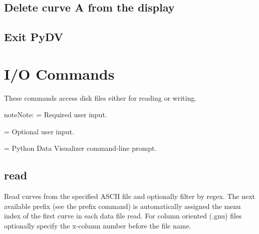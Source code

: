 \documentclass[letterpaper,10pt,english]{sphinxmanual}
\begin{document}
\subsection{Delete curve A from the display}
\label{\detokenize{getting_started:delete-curve-a-from-the-display}}
\begin{sphinxVerbatim}[commandchars=\\\{\}]
\PYG{p}{[}\PYG{p}{]}  
\end{sphinxVerbatim}


\subsection{Exit PyDV}
\label{\detokenize{getting_started:exit-pydv}}
\begin{sphinxVerbatim}[commandchars=\\\{\}]
\PYG{p}{[}\PYG{p}{]} 
\end{sphinxVerbatim}


\section{I/O Commands}
\label{\detokenize{io_commands:i-o-commands}}\label{\detokenize{io_commands:io-commands}}\label{\detokenize{io_commands::doc}}
These commands access disk files either for reading or writing.

\begin{sphinxadmonition}{note}{Note:}
\sphinxstylestrong{\textless{} \textgreater{}} = Required user input.

\sphinxstylestrong{{[}\textless{} \textgreater{}{]}} = Optional user input.

\sphinxstylestrong{{[}PyDV{]}} = Python Data Visualizer command-line prompt.
\end{sphinxadmonition}


\subsection{read}
\label{\detokenize{io_commands:read}}
Read curves from the specified ASCII file and optionally filter by regex. The next available prefix (see the prefix command) is automatically assigned the menu index of the first curve in each data file read. For column oriented (.gnu) files optionally specify the x-column number before the file name. 

\begin{sphinxVerbatim}[commandchars=\\\{\}]
\PYG{p}{[}\PYG{p}{]}  \PYG{p}{[} \PYG{p}{]} \PYG{p}{[}\PYG{p}{]} 
\end{sphinxVerbatim}
\end{document}
